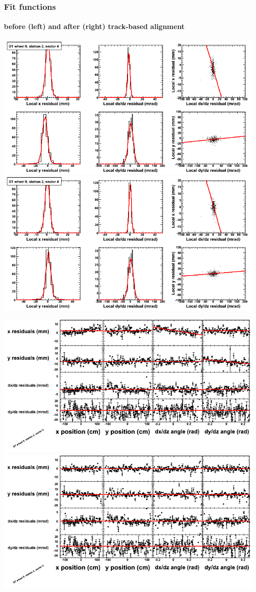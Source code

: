 \documentclass[compress]{beamer}
\begin{document}
\begin{frame}
\frametitle{Fit functions}
\framesubtitle{before (left) and after (right) track-based alignment}
\includegraphics[width=0.5\linewidth]{fitfunctions_re01/MBwhCst2sec04_bellcurves.png} \includegraphics[width=0.5\linewidth]{fitfunctions_re05/MBwhCst2sec04_bellcurves.png}

\includegraphics[width=0.5\linewidth]{fitfunctions_re01/MBwhCst2sec04_polynomials.png} \includegraphics[width=0.5\linewidth]{fitfunctions_re05/MBwhCst2sec04_polynomials.png}
\end{frame}
\end{document}
